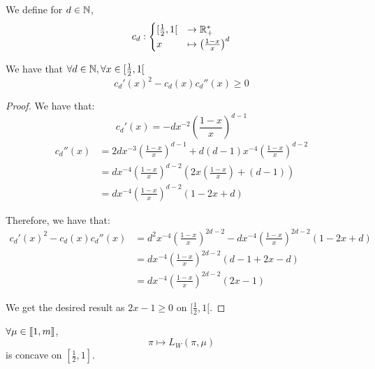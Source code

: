 \begin{lemma}
    \label{lemma:cd_log_concave_compatible}
    We define for $d \in \mathbb{N}$,
    \[ c_d: \begin{cases}
        [\frac{1}{2}, 1[ &\rightarrow \mathbb{R}_+^*\\
        x &\mapsto \left(\frac{1 - x}{x}\right)^d
    \end{cases}\]

    We have that $\forall d \in \mathbb{N}, \forall x \in [\frac{1}{2}, 1[$
    \[ c_d'(x)^2 - c_d(x) c_d''(x) \geq 0 \]
\end{lemma} 
\begin{proof}
    We have that:
    \[ c_d'(x) = -d x^{-2} \left(\frac{1 - x}{x}\right)^{d - 1} \]
    \begin{align}
        c_d''(x) 
        &= 2d x^{-3} \left(\frac{1 - x}{x}\right)^{d - 1} +  d(d-1) x^{-4} \left(\frac{1 - x}{x}\right)^{d - 2} \\
        &= d x^{-4} \left(\frac{1 - x}{x}\right)^{d - 2} \left(2 x\left(\frac{1 - x}{x}\right) + (d - 1)\right) \\
        &= d x^{-4} \left(\frac{1 - x}{x}\right)^{d - 2} \left(1 - 2x + d\right)
    \end{align}

    Therefore, we have that:
    \begin{align}
        c_d'(x)^2 - c_d(x) c_d''(x) 
        &= d^2 x^{-4} \left(\frac{1 - x}{x}\right)^{2d - 2} - d x^{-4} \left(\frac{1 - x}{x}\right)^{2d - 2} \left(1 - 2x + d\right)\\
        &= d x^{-4} \left(\frac{1 - x}{x}\right)^{2d - 2} \left(d - 1 + 2x - d\right)\\
        &= d x^{-4} \left(\frac{1 - x}{x}\right)^{2d - 2} \left(2x - 1\right)
    \end{align}

    We get the desired result as $2x - 1 \geq 0$ on $[\frac{1}{2}, 1[$.
\end{proof}


\begin{thm}
    \label{thm:log_likelihood_concave_appendix}
    $\forall \mu \in \left\llbracket1, m\right\rrbracket$, 
    \[ \pi \mapsto L_W(\pi, \mu) \]
    is concave on $[\frac{1}{2}, 1]$.
\end{thm}

